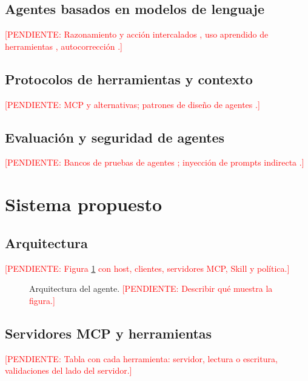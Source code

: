 \documentclass[10pt,twocolumn,a4paper]{article}
\newcommand{\todo}[1]{\textcolor{red}{[PENDIENTE: #1]}}
\begin{document}
\subsection{Agentes basados en modelos de lenguaje}
\todo{Razonamiento y acción intercalados \cite{yao2023react}, uso aprendido de herramientas \cite{schick2023toolformer}, autocorrección \cite{shinn2023reflexion}.}

\subsection{Protocolos de herramientas y contexto}
\todo{MCP \cite{mcp_spec} y alternativas; patrones de diseño de agentes \cite{anthropic2024effective}.}

\subsection{Evaluación y seguridad de agentes}
\todo{Bancos de pruebas de agentes \cite{liu2024agentbench,jimenez2024swebench}; inyección de prompts indirecta \cite{greshake2023injection}.}

\section{Sistema propuesto}
\subsection{Arquitectura}
\todo{Figura \ref{fig:arquitectura} con host, clientes, servidores MCP, Skill y política.}

\begin{figure}[t]
  \centering
  \fbox{\parbox{0.9\columnwidth}{\centering\vspace{2cm}\todo{diagrama de arquitectura}\vspace{2cm}}}
  \caption{Arquitectura del agente. \todo{Describir qué muestra la figura.}}
  \label{fig:arquitectura}
\end{figure}

\subsection{Servidores MCP y herramientas}
\todo{Tabla con cada herramienta: servidor, lectura o escritura, validaciones del lado del servidor.}
\end{document}
